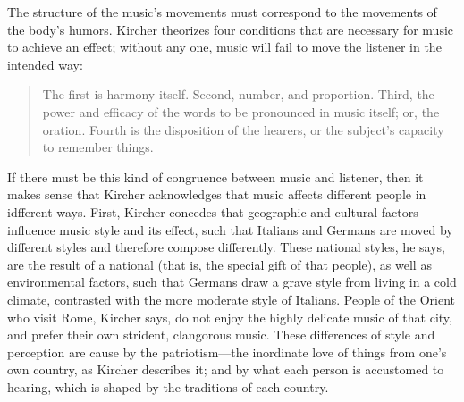 The structure of the music's movements must correspond to the movements of the body's humors.
Kircher theorizes four conditions that are necessary for music to achieve an effect; without any one, music will fail to move the listener in the intended way:
\begin{quote}
  The first is harmony itself.
  Second, number, and proportion.
  Third, the power and efficacy of the words to be pronounced in music itself; or, the oration.
  Fourth is the disposition of the hearers, or the subject's capacity to remember things.%
    \Autocite
    [550: .]
    {Kircher:Musurgia}
\end{quote}

If there must be this kind of congruence between music and listener, then it makes sense that Kircher acknowledges that music affects different people in idfferent ways.
First, Kircher concedes that geographic and cultural factors influence music style and its effect, such that Italians and Germans are moved by different styles and therefore compose differently.
These national styles, he says, are the result of a national  (that is, the special gift of that people), as well as environmental factors, such that Germans draw a grave style from living in a cold climate, contrasted with the more moderate style of Italians.
People of the Orient who visit Rome, Kircher says, do not enjoy the highly delicate music of that city, and prefer their own strident, clangorous music.
These differences of style and perception are cause by the patriotism---the inordinate love of things from one's own country, as Kircher describes it; and by what each person is accustomed to hearing, which is shaped by the traditions of each country.%
    \Autocite[543--544]{Kircher:Musurgia} %

